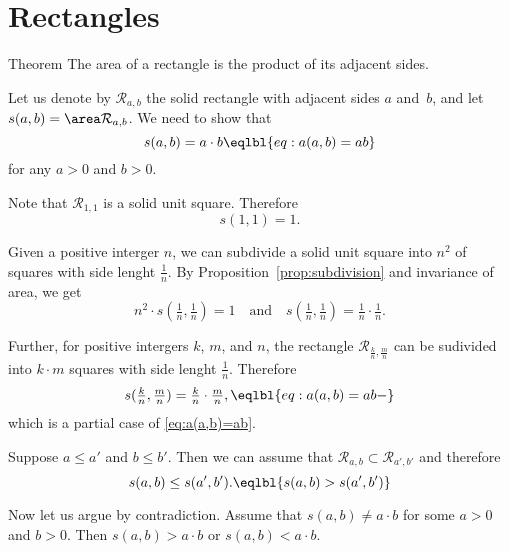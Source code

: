 \section{Rectangles}

\begin{thm}{Theorem}\label{thm:area-rect}
The area of a rectangle is the product of its adjacent sides.
\end{thm}

Let us denote by $\mathcal{R}_{a,b}$ the solid rectangle with adjacent sides $a$ and~$b$,
and let $s(a,b)=\area \mathcal{R}_{a,b}$.
We need to show that
\[s(a,b)=a\cdot b\eqlbl{eq:a(a,b)=ab}\]
for any $a>0$ and $b>0$.

Note that $\mathcal{R}_{1,1}$ is a solid unit square.
Therefore
\[s(1,1)=1.\]

Given a positive interger $n$,
we can subdivide a solid unit square into $n^2$ of squares with side lenght $\tfrac1n$.
By Proposition~\ref{prop:subdivision} and invariance of area, we get
\[n^2\cdot s(\tfrac1n,\tfrac1n)=1
\quad\text{and}\quad
s(\tfrac1n,\tfrac1n)=\tfrac1n\cdot\tfrac1n.\]

Further, for positive intergers $k$, $m$, and $n$, the rectangle $\mathcal{R}_{\frac kn,\frac mn}$ can be sudivided into $k\cdot m$ squares with side lenght $\tfrac1n$.
Therefore
\[s(\tfrac kn,\tfrac mn)=\tfrac kn\cdot \tfrac mn,\eqlbl{eq:a(a,b)=ab-}\]
which is a partial case of \ref{eq:a(a,b)=ab}.

Suppose $a\le a'$ and $b\le b'$.
Then we can assume that $\mathcal{R}_{a,b}\subset \mathcal{R}_{a',b'}$ and therefore
\[s(a,b)\le s(a',b').\eqlbl{s(a,b)>s(a',b')}\]

Now let us argue by contradiction.
Assume that $s(a,b)\ne a\cdot b$ for some $a>0$ and $b>0$.
Then $s(a,b)> a\cdot b$ or $s(a,b) <a\cdot b$.


